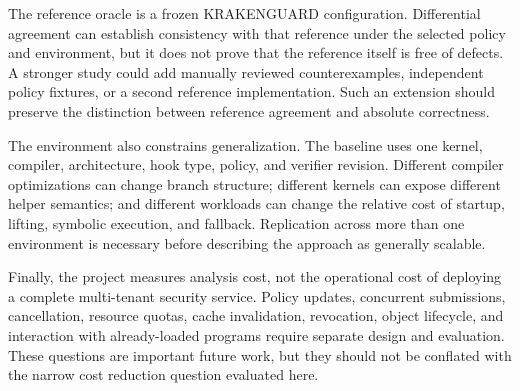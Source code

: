 The reference oracle is a frozen KRAKENGUARD configuration. Differential agreement can establish consistency with that reference under the selected policy and environment, but it does not prove that the reference itself is free of defects. A stronger study could add manually reviewed counterexamples, independent policy fixtures, or a second reference implementation. Such an extension should preserve the distinction between reference agreement and absolute correctness.

The environment also constrains generalization. The baseline uses one kernel, compiler, architecture, hook type, policy, and verifier revision. Different compiler optimizations can change branch structure; different kernels can expose different helper semantics; and different workloads can change the relative cost of startup, lifting, symbolic execution, and fallback. Replication across more than one environment is necessary before describing the approach as generally scalable.

Finally, the project measures analysis cost, not the operational cost of deploying a complete multi-tenant security service. Policy updates, concurrent submissions, cancellation, resource quotas, cache invalidation, revocation, object lifecycle, and interaction with already-loaded programs require separate design and evaluation. These questions are important future work, but they should not be conflated with the narrow cost reduction question evaluated here.

